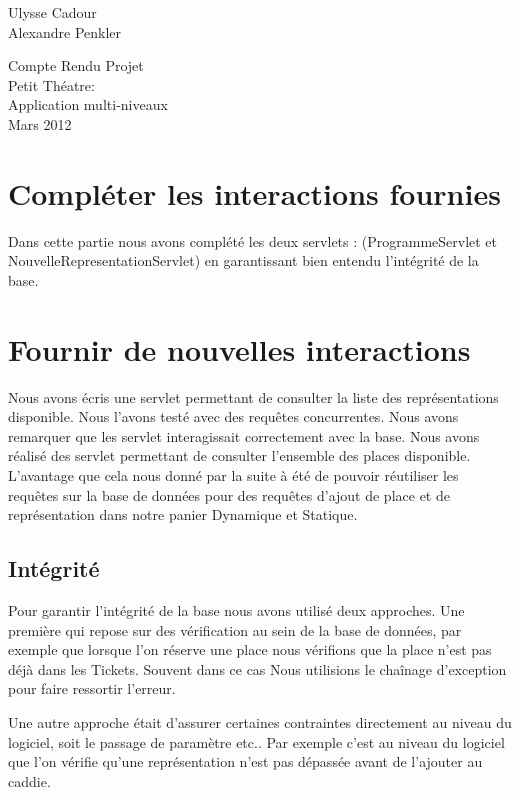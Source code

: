 ﻿\documentclass[12pt]{article}
\begin{document}
\noindent Ulysse Cadour \\
Alexandre Penkler\\


\begin{center}
  {\large  Compte Rendu Projet \\
    Petit Théatre:\\
    Application multi-niveaux
    } \\ %
  Mars 2012\\
\end{center}
\newpage



\section{ Compléter les interactions fournies}
Dans cette partie nous avons complété les deux servlets : (ProgrammeServlet et NouvelleRepresentationServlet) en garantissant bien entendu l’intégrité de la base.

 


\section{ Fournir de nouvelles interactions}

Nous avons écris une servlet permettant de consulter la liste des représentations disponible. Nous l'avons testé avec des requêtes concurrentes. Nous avons remarquer que les servlet interagissait correctement avec la base.
Nous avons réalisé des servlet permettant de consulter l'ensemble des places disponible. L'avantage que cela nous donné par la suite à été de pouvoir réutiliser les requêtes sur la base de données pour des requêtes d'ajout de place et de représentation dans notre panier Dynamique et Statique.


\subsection{Intégrité}
Pour garantir l'intégrité de la base nous avons utilisé deux approches. Une première qui repose sur des vérification au sein de la base de données, par exemple que lorsque l'on réserve une place nous vérifions que la place n'est pas déjà dans les Tickets. Souvent dans ce cas Nous utilisions le chaînage d'exception pour faire ressortir l'erreur.


Une autre approche était d'assurer certaines contraintes directement au niveau du logiciel, soit le passage de paramètre etc.. Par exemple c'est au niveau du logiciel que l'on vérifie qu'une représentation n'est pas dépassée avant de l'ajouter au caddie.
\end{document}

